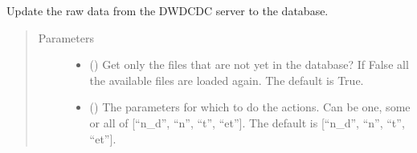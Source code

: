 \documentclass[letterpaper,10pt,english]{sphinxmanual}
\begin{document}
\begin{fulllineitems}
\begin{fulllineitems}
\begin{quote}
\begin{description}
\end{description}\end{quote}

\end{fulllineitems}


\begin{fulllineitems}
\label{\detokenize{weatherDB:weatherDB.broker.Broker.update_raw}}
\sphinxAtStartPar
Update the raw data from the DWD\sphinxhyphen{}CDC server to the database.
\begin{quote}\begin{description}
\item[{Parameters}] \leavevmode\begin{itemize}
\item {} 
\sphinxAtStartPar
{} (\sphinxstyleliteralemphasis{\sphinxupquote{, }}) \textendash{} Get only the files that are not yet in the database?
If False all the available files are loaded again.
The default is True.

\item {} 
\sphinxAtStartPar
{} (\sphinxstyleliteralemphasis{\sphinxupquote{, }}) \textendash{} The parameters for which to do the actions.
Can be one, some or all of {[}“n\_d”, “n”, “t”, “et”{]}.
The default is {[}“n\_d”, “n”, “t”, “et”{]}.

\end{itemize}

\end{description}\end{quote}

\end{fulllineitems}


\end{fulllineitems}
\end{document}
